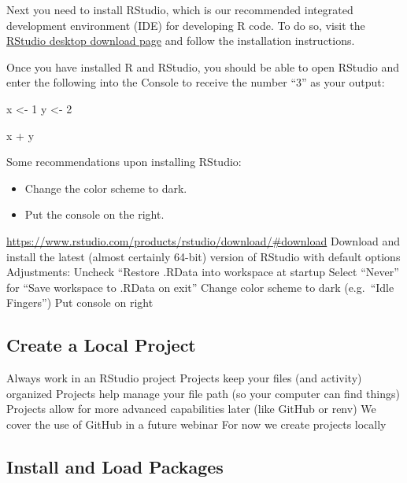 \documentclass[
]{book}
\newenvironment{Shaded}{\begin{snugshade}}{\end{snugshade}}
\newcommand{\DecValTok}[1]{\textcolor[rgb]{0.00,0.00,0.81}{#1}}
\newcommand{\NormalTok}[1]{#1}
\newcommand{\OtherTok}[1]{\textcolor[rgb]{0.56,0.35,0.01}{#1}}
\newcommand{\SpecialCharTok}[1]{\textcolor[rgb]{0.00,0.00,0.00}{#1}}
\providecommand{\tightlist}{%
  \setlength{\itemsep}{0pt}\setlength{\parskip}{0pt}}
\begin{document}
Next you need to install RStudio, which is our recommended integrated development environment (IDE) for developing R code. To do so, visit the \href{https://rstudio.com/products/rstudio/download/}{RStudio desktop download page} and follow the installation instructions.

Once you have installed R and RStudio, you should be able to open RStudio and enter the following into the Console to receive the number ``3'' as your output:

\begin{Shaded}
\begin{Highlighting}[]
\NormalTok{x }\OtherTok{\textless{}{-}} \DecValTok{1}
\NormalTok{y }\OtherTok{\textless{}{-}} \DecValTok{2}

\NormalTok{x }\SpecialCharTok{+}\NormalTok{ y}
\end{Highlighting}
\end{Shaded}

Some recommendations upon installing RStudio:

\begin{itemize}
\tightlist
\item
  Change the color scheme to dark.
\item
  Put the console on the right.
\end{itemize}

\url{https://www.rstudio.com/products/rstudio/download/\#download}
Download and install the latest (almost certainly 64-bit) version of RStudio with default options
Adjustments:
Uncheck ``Restore .RData into workspace at startup
Select ``Never'' for ``Save workspace to .RData on exit''
Change color scheme to dark (e.g.~``Idle Fingers'')
Put console on right

\hypertarget{create-a-local-project}{%
\subsection{Create a Local Project}\label{create-a-local-project}}

Always work in an RStudio project
Projects keep your files (and activity) organized
Projects help manage your file path (so your computer can find things)
Projects allow for more advanced capabilities later (like GitHub or renv)
We cover the use of GitHub in a future webinar
For now we create projects locally

\hypertarget{install-and-load-packages}{%
\subsection{Install and Load Packages}\label{install-and-load-packages}}
\end{document}
